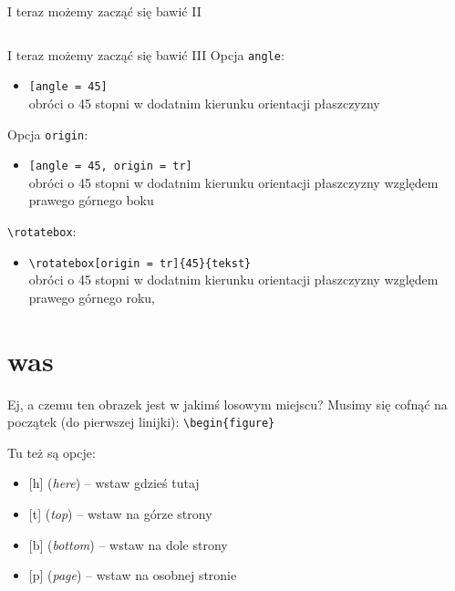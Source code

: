 \documentclass[handout]{beamer}
\newcommand{\tb}{\textbackslash}
\begin{document}
\begin{frame}{I teraz możemy zacząć się bawić II}{}
\begin{columns}
    \end{columns} 
\end{frame}

\begin{frame}{I teraz możemy zacząć się bawić III}{}
    Opcja \texttt{angle}:
    \begin{itemize}
        \item \texttt{[angle = 45]}\\
        obróci o 45 stopni w dodatnim kierunku orientacji płaszczyzny
    \end{itemize}\pause
    Opcja \texttt{origin}:
    \begin{itemize}
        \item \texttt{[angle = 45, origin = tr]}\\
        obróci o 45 stopni w dodatnim kierunku orientacji płaszczyzny względem prawego górnego boku
    \end{itemize}\pause
    \texttt{\tb{rotatebox}}:
    \begin{itemize}
        \item \texttt{\tb{}rotatebox[origin = tr]\{45\}\{tekst\}}\\
        obróci o 45 stopni w dodatnim kierunku orientacji płaszczyzny względem prawego górnego roku, 
    \end{itemize}
    
\end{frame}

\section{was}

\begin{frame}{Ej, a czemu ten obrazek jest w jakimś losowym miejscu?}{}
    Musimy się cofnąć na początek (do pierwszej linijki):
    \texttt{\tb{begin\{figure\}}}
    
    Tu też są opcje:
    \begin{itemize}
        \item{} [h] (\emph{here}) -- wstaw gdzieś tutaj
        \item{} [t] (\emph{top}) -- wstaw na górze strony
        \item{} [b] (\emph{bottom}) -- wstaw na dole strony
        \item{} [p] (\emph{page}) -- wstaw na osobnej stronie
    \end{itemize}
\end{frame}
\end{document}
